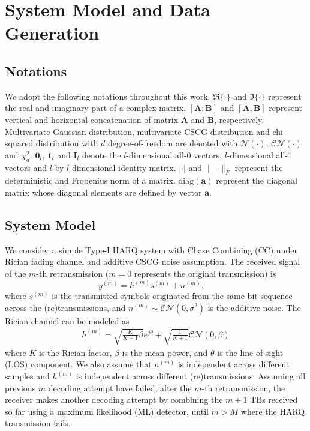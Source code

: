 \documentclass[journal,draftcls,onecolumn,12pt,twoside]{IEEEtran}
\begin{document}
\section{System Model and Data Generation}
\label{sec:model_data}

\subsection{Notations}
\label{subsec:notation}
We adopt the following notations throughout this work. $\Re\{\cdot\}$ and
$\Im\{\cdot\}$ represent the real and imaginary part of a complex matrix.
$[\mathbf{A};\mathbf{B}]$ and $[\mathbf{A},\mathbf{B}]$ represent vertical and
horizontal concatenation of matrix $\mathbf{A}$ and $\mathbf{B}$, respectively. Multivariate Gaussian distribution, 
multivariate CSCG distribution and chi-squared distribution with $d$
degree-of-freedom are denoted with $\mathcal{N}(\cdot)$, $\mathcal{CN}(\cdot)$
and $\chi_d^2$. $\mathbf{0}_l$, $\mathbf{1}_l$ and $\mathbf{I}_l$ denote the
$l$-dimensional all-0 vectors, $l$-dimensional all-1 vectors and
$l$-by-$l$-dimensional identity matrix. $|\cdot|$ and $\|\cdot\|_F$ represent
the deterministic and Frobenius norm of a matrix. $\mbox{diag}(\mathbf{a})$
represent the diagonal matrix whose diagonal elements are defined by vector
$\mathbf{a}$.

\subsection{System Model}
\label{subsec:model}
We consider a simple Type-I HARQ system with Chase Combining (CC) under Rician
fading channel and additive CSCG noise assumption. The received signal of the
$m$-th retransmission ($m=0$ represents the original transmission) is
\begin{equation}
  y^{(m)} = h^{(m)}s^{(m)} + n^{(m)}, \quad
\end{equation}
where $s^{(m)}$ is the transmitted symbols originated from the same bit sequence
across the (re)transmissions, and $n^{(m)}\sim\mathcal{CN}(0,\sigma^2)$ is the
additive noise.
The Rician channel can be modeled as~\cite[(2.55)]{tse2005fundamentals}
\begin{align}
  h^{(m)} = \sqrt{\frac{K}{K+1}\beta}e^{j\theta} +
  \sqrt{\frac{1}{K+1}}\mathcal{CN}(0,\beta)
\end{align}
where $K$ is the Rician factor, $\beta$ is the mean power, and $\theta$ is the
line-of-sight (LOS) component. We also assume that $n^{(m)}$ is independent
across different samples and $h^{(m)}$ is independent across different
(re)transmissions. Assuming all previous $m$ decoding attempt have failed,
after the $m$-th retransmission, the receiver makes another decoding attempt by
combining the $m + 1$ TBs received so far using a maximum likelihood (ML)
detector, until $m > M$ where the HARQ transmission fails.
\end{document}
